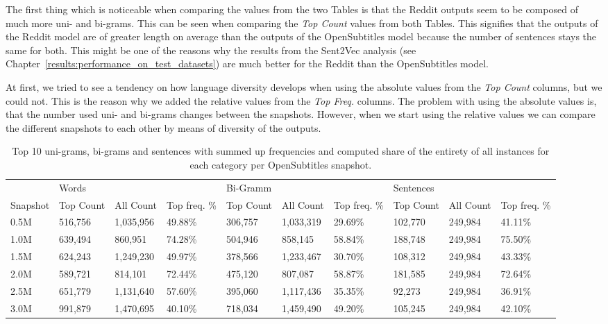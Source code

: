 The first thing which is noticeable when comparing the values from the two Tables is that the Reddit outputs seem to be composed of much more uni- and bi-grams. This can be seen when comparing the \emph{Top Count} values from both Tables. This signifies that the outputs of the Reddit model are of greater length on average than the outputs of the OpenSubtitles model because the number of sentences stays the same for both. This might be one of the reasons why the results from the Sent2Vec analysis (see Chapter~\ref{results:performance_on_test_datasets}) are much better for the Reddit than the OpenSubtitles model.

At first, we tried to see a tendency on how language diversity develops when using the absolute values from the \emph{Top Count} columns, but we could not. This is the reason why we added the relative values from the \emph{Top Freq.} columns. The problem with using the absolute values is, that the number used uni- and bi-grams changes between the snapshots. However, when we start using the relative values we can compare the different snapshots to each other by means of diversity of the outputs. 

\begin{table}[H]
	\centering
	\begin{adjustbox}{max width=\textwidth}
		\begin{tabular}{llllllllll}
			\toprule
			& Words &&&Bi-Gramm&&&Sentences&&\\
			Snapshot & Top Count & All Count& Top freq. \%&  Top Count& All Count& Top freq. \%&  Top Count& All Count& Top freq. \%\\
			\midrule
			0.5M & 516,756	 & 1,035,956	& 49.88\%	&306,757	&1,033,319	&29.69\%	&102,770	&249,984	&41.11\%\\
			1.0M & 639,494	 & 860,951		& 74.28\%	&504,946	&858,145	&58.84\%	&188,748	&249,984	&75.50\%\\
			1.5M & 624,243	 & 1,249,230	& 49.97\%	&378,566	&1,233,467	&30.70\%	&108,312	&249,984	&43.33\%\\
			2.0M & 589,721	 & 814,101		& 72.44\%	&475,120	&807,087	&58.87\%	&181,585	&249,984	&72.64\%\\
			2.5M & 651,779	 & 1,131,640	& 57.60\%	&395,060	&1,117,436	&35.35\%	&92,273		&249,984	&36.91\%\\
			3.0M & 991,879	 & 1,470,695	& 40.10\%	&718,034	&1,459,490	&49.20\%	&105,245	&249,984	&42.10\%\\
			\bottomrule
		\end{tabular}
	\end{adjustbox}
	\caption{Top 10 uni-grams, bi-grams and sentences with summed up frequencies and computed share of the entirety of all instances for each category per OpenSubtitles snapshot.}
	\label{results:top_10_frequency:OpenSubtitles}
\end{table}


